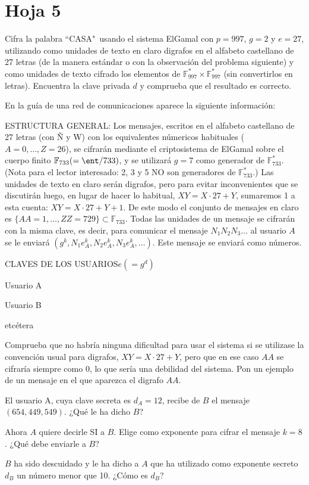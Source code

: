 \section{Hoja 5}
\begin{problem}[1]
Cifra la palabra ``CASA"\ usando el sistema ElGamal con  $p=997$, $g=2$ y $e=27$, utilizando como unidades de texto en claro digrafos  en el alfabeto castellano de 27 letras (de la manera estándar o con la observación del problema siguiente) y como unidades de texto cifrado los elementos de $\mathbb{F}_{997}^* \times \mathbb{F}_{997}^*$ (sin convertirlos en letras). Encuentra la clave privada $d$ y comprueba que el resultado es correcto.

\solution
\end{problem}

\begin{problem}[2]
En la guía de una red de comunicaciones aparece la siguiente
información:

 ESTRUCTURA GENERAL: Los mensajes, escritos en el alfabeto
castellano de 27 letras (con Ñ y W) con los equivalentes númericos
habituales ($A=0,\dots,Z=26$), se cifrarán mediante el
criptosistema de ElGamal sobre el cuerpo finito
$\mathbb{F}_{733}(=\ent/733)$, y  se utilizará $g=7$ como generador de
$\mathbb{F}_{733}^*$. (Nota para el lector interesado: 2, 3 y 5 NO son
generadores  de $\mathbb{F}_{733}^*$.) Las unidades de texto en claro
serán digrafos, pero para evitar inconvenientes que se discutirán
luego, en lugar de hacer lo habitual, $XY=X\cdot27+Y$, sumaremos 1
a esta cuenta: $XY=X\cdot27+Y+1$. De este modo el conjunto de
mensajes en claro es $\{AA=1,\dots,ZZ=729\}\subset\mathbb{F}_{733}$. Todas
las unidades de un mensaje se cifrarán con la misma clave, es
decir, para comunicar el mensaje $N_1N_2N_3\dots$ al usuario $A$
se le enviará $(g^k,N_1e_A^k,N_2e_A^k,N_3e_A^k,\dots)$. Este
mensaje se enviará como números.


CLAVES DE LOS
USUARIOS\dotfill$e(=g^d)$\hphantom{AAAAAAAAAAAAAAAAAAAA}

Usuario A\hphantom{$(=g^d)$AAAAAAAAAAAAAAAAAA}

Usuario B\hphantom{$(=g^d)$AAAAAAAAAAAAAAAAAA}

etcétera

\ppart Comprueba que no habría ninguna dificultad para usar el
sistema si se utilizase la convención usual para digrafos,
$XY=X\cdot27+Y$, pero que en ese caso $AA$ se cifraría siempre
como 0, lo que sería una debilidad del sistema. Pon un ejemplo de
un mensaje en el que aparezca el digrafo $AA$.

\ppart El usuario A, cuya clave secreta es $d_A=12$, recibe de $B$ el
mensaje $(654,449,549)$. ¿Qué le ha dicho $B$?

\ppart Ahora $A$ quiere decirle SI a $B$. Elige como exponente para
cifrar el mensaje $k=8$. ¿Qué debe enviarle a $B$?

\ppart $B$ ha sido descuidado y le ha dicho a $A$ que ha utilizado
como exponente secreto $d_B$ un número menor que 10. ¿Cómo es
$d_B$?
\solution
\end{problem}


